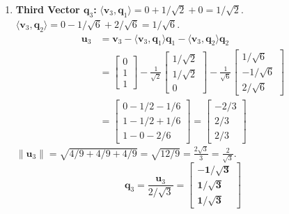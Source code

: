\begin{enumerate}
\begin{equation*}
    \end{equation*}
    \item \textbf{Third Vector $\mathbf{q}_3$:}
    $\langle \mathbf{v}_3, \mathbf{q}_1 \rangle = 0 + 1/\sqrt{2} + 0 = 1/\sqrt{2}$.
    $\langle \mathbf{v}_3, \mathbf{q}_2 \rangle = 0 - 1/\sqrt{6} + 2/\sqrt{6} = 1/\sqrt{6}$.
    \begin{align*}
    \mathbf{u}_3 &= \mathbf{v}_3 - \langle \mathbf{v}_3, \mathbf{q}_1 \rangle \mathbf{q}_1 - \langle \mathbf{v}_3, \mathbf{q}_2 \rangle \mathbf{q}_2 \\
    &= \begin{bmatrix} 0 \\ 1 \\ 1 \end{bmatrix} - \frac{1}{\sqrt{2}} \begin{bmatrix} 1/\sqrt{2} \\ 1/\sqrt{2} \\ 0 \end{bmatrix} - \frac{1}{\sqrt{6}} \begin{bmatrix} 1/\sqrt{6} \\ -1/\sqrt{6} \\ 2/\sqrt{6} \end{bmatrix} \\
    &= \begin{bmatrix} 0 - 1/2 - 1/6 \\ 1 - 1/2 + 1/6 \\ 1 - 0 - 2/6 \end{bmatrix} = \begin{bmatrix} -2/3 \\ 2/3 \\ 2/3 \end{bmatrix}
    \end{align*}
    $\|\mathbf{u}_3\| = \sqrt{4/9 + 4/9 + 4/9} = \sqrt{12/9} = \frac{2\sqrt{3}}{3} = \frac{2}{\sqrt{3}}$.
    \begin{equation*}
    \mathbf{q}_3 = \frac{\mathbf{u}_3}{2/\sqrt{3}} = \mathbf{\begin{bmatrix} -1/\sqrt{3} \\ 1/\sqrt{3} \\ 1/\sqrt{3} \end{bmatrix}}
    \end{equation*}
\end{enumerate}

